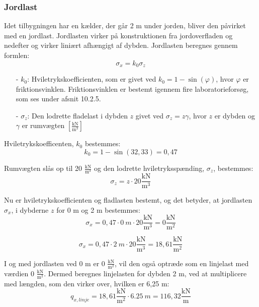 \subsubsection{Jordlast}
Idet tilbygningen har en kælder, der går 2 m under jorden, bliver den påvirket med en jordlast. Jordlasten virker på konstruktionen fra jordoverfladen og nedefter og virker liniært afhængigt af dybden.
\newline
\newline
Jordlasten beregnes gennem formlen:
\begin{equation}
	\sigma_x = k_0 \sigma_z
\end{equation}

\begin{itemize}
	\item[-] $k_0$: Hviletrykskoefficienten, som er givet ved $k_0=1-\sin(\varphi)$, hvor $\varphi$ er friktionsvinklen. Friktionsvinklen er bestemt igennem fire laboratorieforsøg, som ses under afsnit 10.2.5. 
	\item[-] $\sigma_z$: Den lodrette fladelast i dybden $z$ givet ved $\sigma_z = z\gamma$, hvor $z$ er dybden og $\gamma$ er rumvægten $[\frac{\text{kN}}{\text{m}^3}]$
\end{itemize}

Hviletrykskoefficenten, $k_0$ bestemmes:
\begin{equation}
	k_0 = 1 - \sin(32,\!33) = 0,\!47
\end{equation}

Rumvægten slås op til 20 $\frac{\text{kN}}{\text{m}^3}$ \citep[ s. 386]{stabi} og den lodrette hviletryksspænding, $\sigma_z$, bestemmes:
\begin{equation}
\sigma_z = z\cdot 20 \frac{\text{kN}}{\text{m}^3}
\end{equation}

Nu er hviletrykskoefficienten og fladlasten bestemt, og det betyder, at jordlasten $\sigma_x$, i dybderne $z$ for 0 m og 2 m bestemmes:
\begin{equation}
\sigma_x = 0,\!47\cdot \SI{0}{m}\cdot 20 \frac{\text{kN}}{\text{m}^3} = 0 \frac{\text{kN}}{\text{m}^2}
\end{equation}

\begin{equation}
	\sigma_x = 0,\!47\cdot \SI{2}{m}\cdot 20 \frac{\text{kN}}{\text{m}^3} = 18,\!61 \frac{\text{kN}}{\text{m}^2}
\end{equation}

I og med jordlasten ved 0 m er 0 $\frac{\text{kN}}{\text{m}^2}$, vil den også optræde som en linjelast med værdien 0 $\frac{\text{kN}}{\text{m}^2}$. Dermed beregnes linjelasten for dybden 2 m, ved at multiplicere med længden, som den virker over, hvilken er 6,25 m:
\begin{equation}
	q_{x,linje} = 18,\!61 \frac{\text{kN}}{\text{m}^2}\cdot \SI{6,25}{m} = 116,\!32 \frac{\text{kN}}{\text{m}}
\end{equation}

